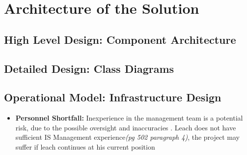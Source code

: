 \documentclass[12pt]{article} %
\begin{document}
	
	\section{Architecture of the Solution}
		
	\subsection{High Level Design: Component Architecture}
	
	\subsection{Detailed Design: Class Diagrams}
	
	\subsection{Operational Model: Infrastructure Design}
	
	
	
	
	
	
	
	
	
	\begin{itemize} 
		\item \textbf{Personnel Shortfall:} Inexperience in the management team is a potential risk, due to the possible oversight and inaccuracies . Leach does not have sufficient IS Management experience\textit{(pg 502 paragraph 4)}, the project may suffer if leach continues
		at his current position 
		
	\end{itemize}
	
\end{document}
